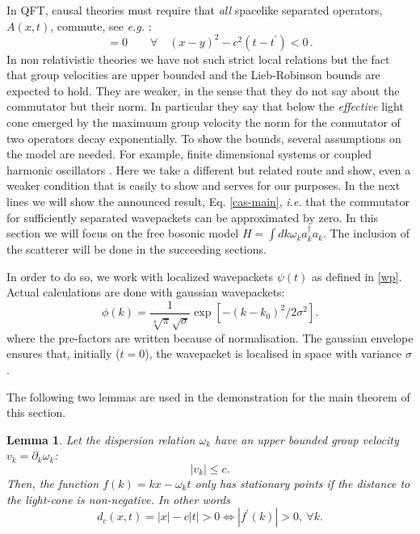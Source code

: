 \documentclass[notitlepage, prx, preprint, amsmath,superscriptaddress,amssymb]{revtex4-1}
\newtheorem{lemma}{Lemma}[section]
\begin{document}
In QFT, causal theories must require that \emph{all} spacelike separated operators, $A(x,t)$,  commute, see \emph{e.g.} \cite[Sect. 2.6.1]{tong2006}:
\begin{equation}
[ A (x, t), A (y,t^\prime)]= 0  \qquad \forall \quad  (x-y)^2 -c^2 (t-t^\prime) <0 \, .
\end{equation}
In non relativistic theories we have not such strict local relations but the fact that group velocities are upper bounded and the Lieb-Robinson bounds are expected to hold.  They are weaker, in the sense that they do not say about the commutator but their norm.  In particular they say that below the \emph{effective} light cone emerged by the maximuum group velocity the norm for the conmutator of two operators decay exponentially.   To show the bounds, several assumptions on the model are needed.  For example, finite dimensional systems or coupled harmonic oscillators \cite{}.  
Here we take a different but related route and show, even a weaker condition that is easily to show and serves for our purposes.  
In the next lines we will show the announced result, Eq. \eqref{cas-main}, \emph{i.e.} that  the commutator   for sufficiently separated wavepackets can be approximated by zero.    
In this section we will focus on the free bosonic model $H = \int dk \omega_k a_k^\dagger a_k$. The inclusion of the scatterer will be done in the succeeding sections.

In order to do so, we  work with localized wavepackets $\psi(t)$ as defined in \eqref{wp}.  Actual calculations are done with gaussian wavepackets:
\begin{equation}
\phi(k) = \frac{1}{\sqrt[4]{\pi}\sqrt{\sigma}}
\exp\left[-(k-k_0)^2/2\sigma^2\right].
\label{eq:gaussian}
\end{equation}
where the pre-factors are written because of normalisation.   The gaussian envelope ensures that, initially ($t=0$), the wavepacket is localised in space with variance $\sigma$.   


The following  two lemmas  are  used  in the demonstration for the main theorem of this section.

\begin{lemma}
\label{lemma:cones}
Let the dispersion relation $\omega_k$ have an upper bounded group velocity $v_k=\partial_k \omega_k$:
\begin{equation}
\vert  v_k \vert \leq c.
\end{equation}
Then, the function $f(k) = k x - \omega_k t$ only has stationary points if the distance to the light-cone is non-negative. In other words
\begin{equation}
d_c(x,t) =  | x | - c | t |  > 0 \Leftrightarrow | f^\prime (k) | > 0,\: \forall k.\label{eq:distance}
\end{equation}
\end{lemma}
\end{document}
